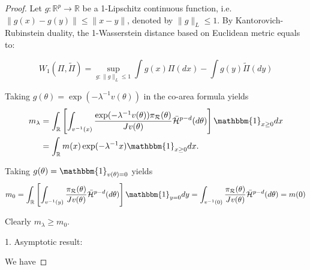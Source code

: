 \documentclass[10pt,fleqn]{article}
\newcommand{\mc}[1]{\mathcal{#1}}
\DeclareMathOperator{\1}{\mathbbm{1}}
\begin{document}
\begin{proof}[Proof]
Let $g:\mathbb{R}^p\rightarrow \mathbb{R}$ be a 1-Lipschitz continuous function, i.e. $\|g(x)-g(y)\|\le \|x-y\|$, denoted by $\|g\|_L\le 1$. 
By Kantorovich-Rubinstein duality, the 1-Wasserstein distance based on Euclidean metric equals to: 

\begin{equation}
W_1(\Pi,\tilde\Pi)=\underset{g:\|g\|_L\le 1}\sup \int g(x) \Pi(dx) -  \int g(y) \tilde\Pi(dy) 
\end{equation}

Taking $g(\theta)=\exp(-\lambda^{-1}v(\theta))$ in the co-area formula yields
\begin{equation}
\begin{aligned}
m_\lambda
& = \int_\mathbb{R}  \left[ \int_{v^{-1}(x)} \frac{ \exp(- \lambda^{-1} v(\theta) ) \pi_{\mc R}(\theta)}{ J v(\theta) }  \bar{\mc H}^{p-d}(d \theta) \right] \mathbbm{1}_{x \ge 0}  d x \\
& = \int_\mathbb{R}  m(x)\exp(- \lambda^{-1} x ) \mathbbm{1}_{x \ge 0}  d x .
\end{aligned}
\end{equation}

Taking $g(\theta)={\mathbbm{1}_{v(\theta)=0}}$ yields 
\begin{equation}
m_0
= \int_\mathbb{R} \left[ \int_{v^{-1}(y)} \frac{ \pi_{\mc R}(\theta) }{ J v(\theta) }  \bar{\mc H}^{p-d}(d \theta) \right]\mathbbm{1}_{y=0} dy   =  \int_{v^{-1}(0)} \frac{ \pi_{\mc R}(\theta) }{ J v(\theta) } \bar{\mc H}^{p-d}(d \theta) =m(0)
\end{equation}


Clearly $m_\lambda \ge m_0$.

1. Asymptotic result:

We have


\end{proof}
\end{document}
